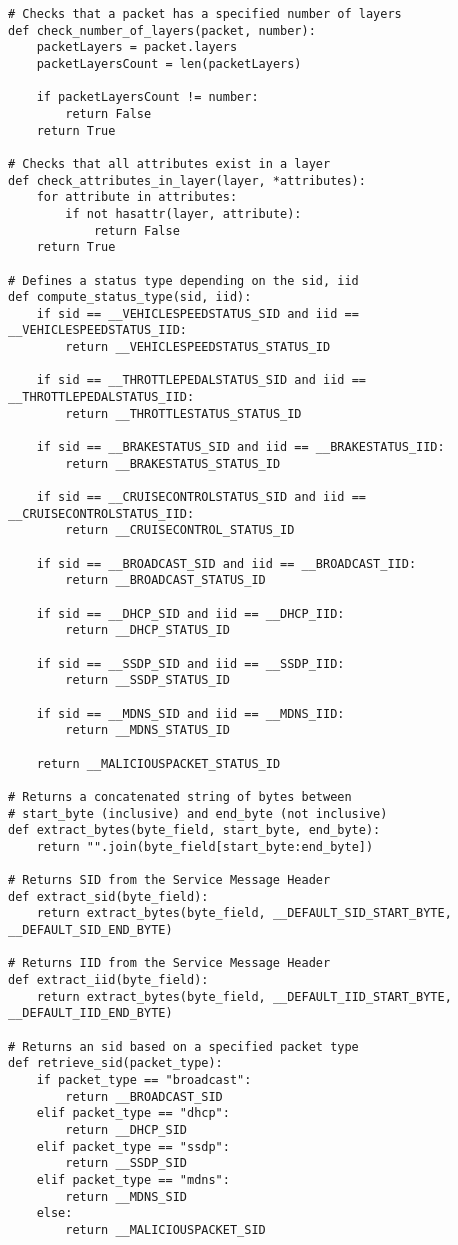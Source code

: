 \begin{verbatim}
# Checks that a packet has a specified number of layers
def check_number_of_layers(packet, number):
    packetLayers = packet.layers
    packetLayersCount = len(packetLayers)
    
    if packetLayersCount != number:
        return False
    return True

# Checks that all attributes exist in a layer
def check_attributes_in_layer(layer, *attributes):
    for attribute in attributes:
        if not hasattr(layer, attribute):
            return False
    return True

# Defines a status type depending on the sid, iid
def compute_status_type(sid, iid):
    if sid == __VEHICLESPEEDSTATUS_SID and iid == __VEHICLESPEEDSTATUS_IID:
        return __VEHICLESPEEDSTATUS_STATUS_ID

    if sid == __THROTTLEPEDALSTATUS_SID and iid == __THROTTLEPEDALSTATUS_IID:
        return __THROTTLESTATUS_STATUS_ID

    if sid == __BRAKESTATUS_SID and iid == __BRAKESTATUS_IID:
        return __BRAKESTATUS_STATUS_ID

    if sid == __CRUISECONTROLSTATUS_SID and iid == __CRUISECONTROLSTATUS_IID:
        return __CRUISECONTROL_STATUS_ID

    if sid == __BROADCAST_SID and iid == __BROADCAST_IID:
        return __BROADCAST_STATUS_ID

    if sid == __DHCP_SID and iid == __DHCP_IID:
        return __DHCP_STATUS_ID

    if sid == __SSDP_SID and iid == __SSDP_IID:
        return __SSDP_STATUS_ID

    if sid == __MDNS_SID and iid == __MDNS_IID:
        return __MDNS_STATUS_ID

    return __MALICIOUSPACKET_STATUS_ID

# Returns a concatenated string of bytes between 
# start_byte (inclusive) and end_byte (not inclusive)
def extract_bytes(byte_field, start_byte, end_byte):
    return "".join(byte_field[start_byte:end_byte])

# Returns SID from the Service Message Header
def extract_sid(byte_field):
    return extract_bytes(byte_field, __DEFAULT_SID_START_BYTE, __DEFAULT_SID_END_BYTE)

# Returns IID from the Service Message Header
def extract_iid(byte_field):
    return extract_bytes(byte_field, __DEFAULT_IID_START_BYTE, __DEFAULT_IID_END_BYTE)

# Returns an sid based on a specified packet type
def retrieve_sid(packet_type):
    if packet_type == "broadcast":
        return __BROADCAST_SID
    elif packet_type == "dhcp":
        return __DHCP_SID
    elif packet_type == "ssdp":
        return __SSDP_SID
    elif packet_type == "mdns":
        return __MDNS_SID
    else:
        return __MALICIOUSPACKET_SID


\end{verbatim}
